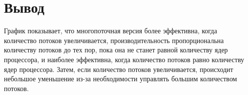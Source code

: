 
\section{Вывод}

График показывает, что многопоточная версия более эффективна,
когда количество потоков увеличивается, производительность пропорциональна количеству потоков до тех пор,
пока она не станет равной количеству ядер процессора, и наиболее эффективна,
когда количество потоков равно количеству ядер процессора.
Затем, если количество потоков увеличивается, происходит небольшое уменьшение
из-за необходимости управлять большим количеством потоков.
